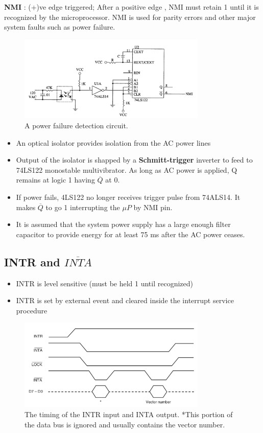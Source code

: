 \textbf{NMI} : (+)ve edge triggered; After a positive edge , NMI must retain 1 until it is recognized by the microprocessor.
NMI is used for parity errors and other major system faults such as power failure.

\begin{figure}[h!]
  \includegraphics[width = 0.8\textwidth]{./figures/NMI.png}
  \caption{A power failure detection circuit.}
\end{figure}

\begin{itemize}
  \item An optical isolator provides isolation from the AC power lines
  \item Output of the isolator is shapped by a \textbf{Schmitt-trigger} inverter to feed to 74LS122 monostable multivibrator. As long as AC power is applied, Q remains at logic 1 having $\overline{Q}$ at 0.
  \item If power fails, 4LS122 no longer receives trigger pulse from 74ALS14. It makes $\overline{Q}$ to go 1 interrupting the $\mu P$ by NMI pin.
  \item It is assumed that the system power supply has a large enough filter capacitor to provide energy for at least 75 ms after the AC power ceases.
\end{itemize}
\subsection{INTR and $\overline{INTA}$}
\begin{itemize}
  \item INTR is level sensitive (must be held 1 until recognized)
  \item INTR is set by external event and cleared inside the interrupt service procedure
\end{itemize}

\begin{figure}[h!]
  \includegraphics[width = 0.8\textwidth]{./figures/INTR_Timing.png}
  \caption{The timing of the INTR input and INTA output. *This portion of the data bus is ignored and usually contains the vector number.}
\end{figure}

